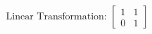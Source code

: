 \documentclass[preview]{standalone}
\begin{document}
\begin{align*}
\text{Linear Transformation: } \begin{bmatrix} 1 & 1 \\ 0 & 1 \end{bmatrix}
\end{align*}
\end{document}
